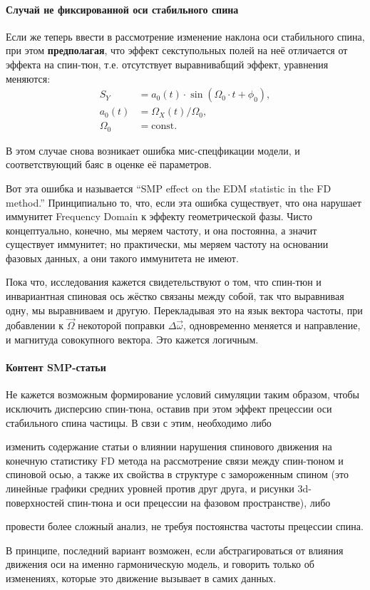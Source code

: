 \documentclass{article}
\newcommand{\W}{\Omega}
\newcommand{\w}{\omega}
\newcommand{\const}{\mathrm{const}}
\begin{document}
\paragraph{Случай не фиксированной оси стабильного спина}
Если же теперь ввести в рассмотрение изменение наклона оси стабильного спина, при этом
\textbf{предполагая}, что эффект секступольных полей на неё отличается от эффекта на спин-тюн,
т.е. отсутствует выравнивабщий эффект, уравнения меняются:
\begin{align*}
  S_Y &= a_0(t)\cdot \sin(\W_0\cdot t + \phi_0), \\
  a_0(t) &= \W_X(t) / \W_0, \\
  \W_0 &= \const.
\end{align*}

В этом случае снова возникает ошибка мис-спецфикации модели, и соответствующий баяс в оценке её параметров.

Вот эта ошибка и называется ``SMP effect on the EDM statistic in the FD method.'' Принципиально то,
что, если эта ошибка существует, что она нарушает иммунитет Frequency Domain к эффекту геометрической фазы.
Чисто концептуально, конечно, мы меряем частоту, и она постоянна, а значит существует иммунитет;
но практически, мы меряем частоту на основании фазовых данных, а они такого иммунитета не имеют.

Пока что, исследования кажется свидетельствуют о том, что спин-тюн и инвариантная спиновая ось жёстко связаны
между собой, так что выравнивая одну, мы выравниваем и другую. Перекладывая это на язык вектора частоты,
при добавлении к $\vec\W$ некоторой поправки $\Delta\vec\w$, одновременно меняется и направление, и магнитуда
совокупного вектора. Это кажется логичным.

\paragraph{Контент SMP-статьи}
Не кажется возможным формирование условий симуляции таким образом, чтобы исключить дисперсию спин-тюна,
оставив при этом эффект прецессии оси стабильного спина частицы. В свзи с этим, необходимо либо
\begin{inparaenum}
\item изменить содержание статьи о влиянии нарушения спинового движения на конечную статистику FD метода
  на рассмотрение связи между спин-тюном и спиновой осью, а также их свойства в структуре с
  замороженным спином (это линейные графики средних уровней против друг друга, и рисунки 3d-поверхностей
  спин-тюна и оси прецессии на фазовом пространстве), либо
\item провести более сложный анализ, не требуя постоянства частоты прецессии спина.
\end{inparaenum}

В принципе, последний вариант возможен, если абстрагироваться от влияния движения оси на
именно гармоническую модель, и говорить только об изменениях, которые это движение вызывает в самих данных. 
\end{document}
